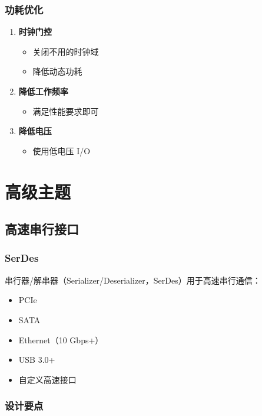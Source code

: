 \subsubsection{功耗优化}

\begin{enumerate}
  \item \textbf{时钟门控}
    \begin{itemize}
      \item 关闭不用的时钟域
      \item 降低动态功耗
    \end{itemize}

  \item \textbf{降低工作频率}
    \begin{itemize}
      \item 满足性能要求即可
    \end{itemize}

  \item \textbf{降低电压}
    \begin{itemize}
      \item 使用低电压 I/O
    \end{itemize}
\end{enumerate}

\section{高级主题}

\subsection{高速串行接口}

\subsubsection{SerDes}

串行器/解串器（Serializer/Deserializer，SerDes）用于高速串行通信：

\begin{itemize}
  \item PCIe
  \item SATA
  \item Ethernet（10 Gbps+）
  \item USB 3.0+
  \item 自定义高速接口
\end{itemize}

\subsubsection{设计要点}

